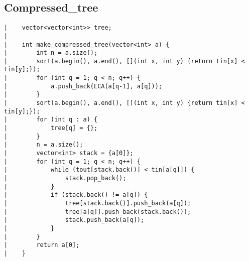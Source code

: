 \documentclass[a4paper, 10pt]{article}
\begin{document}
\begin{center}
\section*{Compressed\_tree}
\begin{verbatim}
|    vector<vector<int>> tree;
|    
|    int make_compressed_tree(vector<int> a) {
|        int n = a.size();
|        sort(a.begin(), a.end(), [](int x, int y) {return tin[x] < tin[y];});
|        for (int q = 1; q < n; q++) {
|            a.push_back(LCA(a[q-1], a[q]));
|        }
|        sort(a.begin(), a.end(), [](int x, int y) {return tin[x] < tin[y];});
|        for (int q : a) {
|            tree[q] = {};
|        }
|        n = a.size();
|        vector<int> stack = {a[0]};
|        for (int q = 1; q < n; q++) {
|            while (tout[stack.back()] < tin[a[q]]) {
|                stack.pop_back();
|            }
|            if (stack.back() != a[q]) {
|                tree[stack.back()].push_back(a[q]);
|                tree[a[q]].push_back(stack.back());
|                stack.push_back(a[q]);
|            }
|        }
|        return a[0];
|    }
\end{verbatim}


\end{center}
\end{document}
